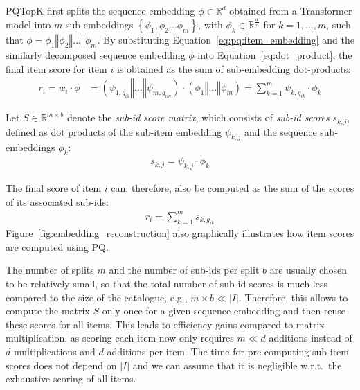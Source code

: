 \documentclass[sigconf,natbib=true, review=False]{acmart} %
\newcommand{\pageenlarge}[1]{\marginnote{#1}\enlargethispage{#1\baselineskip}}
\newcommand{\rsasha}[1]{\textcolor[HTML]{000000}{#1}}
\newcommand{\scrc}[1]{\textcolor[HTML]{000000}{#1}}
\begin{document}
 PQTopK first splits the sequence embedding $\phi \in \mathbb{R}^{d}$ \rsasha{obtained from a Transformer model} into $m$ sub-embeddings $\left\{\phi_1, \phi_2 ... \phi_m\right\}$, with $\phi_{k} \in \mathbb{R}^{\frac{d}{m}}$ for $k=1, \ldots,m$, such that $\phi = \phi_1  \mathbin\Vert \phi_2  \mathbin\Vert ... \mathbin\Vert  \phi_m$.
By substituting Equation~\eqref{eq:pq:item_embedding} and the similarly decomposed sequence embedding $\phi$ into Equation~\eqref{eq:dot_product}, the final item score for item $i$ is obtained as the sum of sub-embedding dot-products: 
\begin{align}
   r_i = w_i \cdot \phi &= (\psi_{1,g_{i1}} \mathbin\Vert ... \mathbin\Vert  \psi_{m,g_{im}}) \cdot (\phi_1  \mathbin\Vert ... \mathbin\Vert  \phi_m) = \sum_{k=1}^m \psi_{k,g_{ik}} \cdot \phi_k \nonumber
\end{align}

Let $S \in \mathbb{R}^{m \times b}$ denote the \emph{sub-id score matrix}, which consists of \emph{sub-id scores} $s_{k,j}$, defined as dot products of the sub-item embedding $\psi_{k,j}$ and the sequence sub-embeddings $\phi_k$:
\begin{align}
s_{k,j} = \psi_{k,j} \cdot \phi_k\label{eq:sub_item_scores}
\end{align}

The final score of item $i$ can, therefore, also be computed as the sum of the scores of its associated sub-ids:
\begin{align}
   r_{i} = \sum_{k=1}^m s_{k,g_{ik}} \label{eq:sum_sub_scores}
\end{align}
\scrc{Figure~\ref{fig:embedding_reconstruction} also graphically illustrates how item scores are computed using PQ.}

 The number of splits $m$ and the number of sub-ids per split $b$ are usually chosen to be relatively small, 
so that the total number of sub-id scores is much less compared to the size of the catalogue, e.g., $m\times b \ll |I|$.
%
Therefore, \scrc{this allows to compute the matrix $S$ only once for a given sequence embedding} and then reuse these scores for all items. This leads to efficiency gains compared to matrix multiplication, as scoring each item now only requires $m \ll d$ additions instead of $d$ multiplications and $d$ additions per item. %
The time for pre-computing sub-item scores %
does not depend on $|I|$ %
and 
we can assume that it is negligible w.r.t.\ the exhaustive scoring of all items. 
\end{document}
